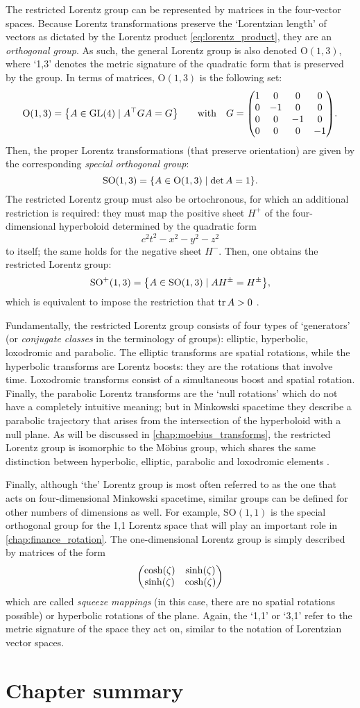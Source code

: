 The restricted Lorentz group can be represented by matrices in the four-vector spaces. Because Lorentz transformations preserve the `Lorentzian length' of vectors as dictated by the Lorentz product \cref{eq:lorentz_product}, they are an \emph{orthogonal group}. As such, the general Lorentz group is also denoted $\text{O}(1,3)$, where `1,3' denotes the metric signature of the quadratic form that is preserved by the group. In terms of matrices, $\text{O}(1,3)$ is the following set: \cite{Baker1967}
$$ \text{O}(1, 3) = \qty{A \in \text{GL}(4) \mid A^\top G A = G} \qquad \text{with}\quad G = \mqty(\dmat[0]{1,-1,-1,-1}). $$
Then, the proper Lorentz transformations (that preserve orientation) are given by the corresponding \emph{special orthogonal group}:
$$ \text{SO}(1, 3) = \qty{A \in \text{O}(1, 3) \mid \det A = 1}.$$
The restricted Lorentz group must also be ortochronous, for which an additional restriction is required: they must map the positive sheet $H^+$ of the four-dimensional hyperboloid determined by the quadratic form 
$$ c^2t^2 - x^2 - y^2 - z^2 $$
to itself; the same holds for the negative sheet $H^-$. Then, one obtains the restricted Lorentz group: \cite{Baker1967}
$$ \text{SO}^+(1, 3) = \qty{A \in \text{SO}(1, 3) \mid AH^{\pm} = H^{\pm}}, $$
which is equivalent to impose the restriction that $\trace A > 0$ \cite{Balazs1986}.

Fundamentally, the restricted Lorentz group consists of four types of `generators' (or \emph{conjugate classes} in the terminology of groups): elliptic, hyperbolic, loxodromic and parabolic. The elliptic transforms are spatial rotations, while the hyperbolic transforms are Lorentz boosts: they are the rotations that involve time. Loxodromic transforms consist of a simultaneous boost and spatial rotation. Finally, the parabolic Lorentz transforms are the `null rotations' which do not have a completely intuitive meaning; but in Minkowski spacetime they describe a parabolic trajectory that arises from the intersection of the hyperboloid with a null plane. As will be discussed in \cref{chap:moebius_transforms}, the restricted Lorentz group is isomorphic to the Möbius group, which shares the same distinction between hyperbolic, elliptic, parabolic and loxodromic elements \cite{Needham2021}.

Finally, although `the' Lorentz group is most often referred to as the one that acts on four-dimensional Minkowski spacetime, similar groups can be defined for other numbers of dimensions as well. For example, $\text{SO}(1, 1)$ is the special orthogonal group for the 1,1 Lorentz space that will play an important role in \cref{chap:finance_rotation}. The one-dimensional Lorentz group is simply described by matrices of the form
$$ \mqty(\cosh(\zeta) & \sinh(\zeta)\\\sinh(\zeta)&\cosh(\zeta)) $$
which are called \emph{squeeze mappings} (in this case, there are no spatial rotations possible) or hyperbolic rotations of the plane. Again, the `1,1' or `3,1' refer to the metric signature of the space they act on, similar to the notation of Lorentzian vector spaces.

\section*{Chapter summary}